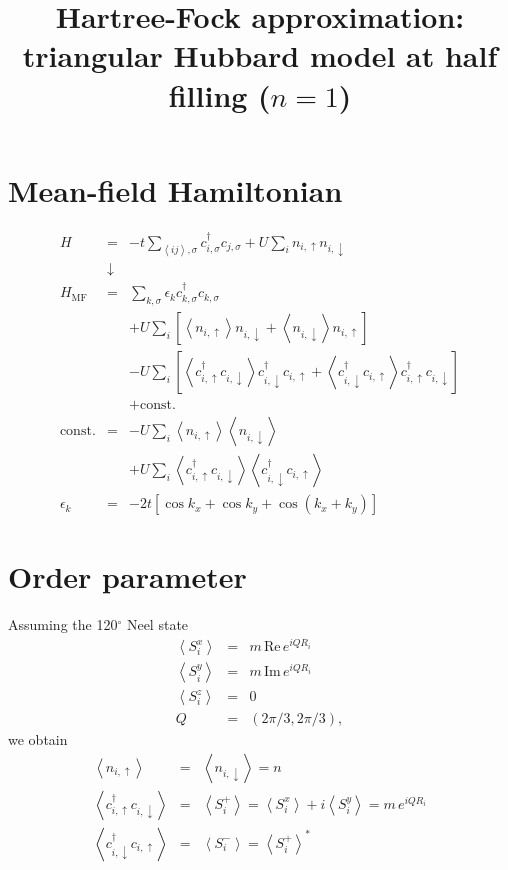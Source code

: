 \documentclass[a4paper,11pt]{article}
\begin{document}
\allowdisplaybreaks


\title{Hartree-Fock approximation:
triangular Hubbard model at half filling ($n=1$)}
\author{}
\date{}
\maketitle

\section{Mean-field Hamiltonian}

\begin{eqnarray}
 H &=&
  - t \sum_{\left<ij\right>,\sigma} c_{i,\sigma}^{\dagger} c_{j,\sigma}
  + U\sum_{i} n_{i,\uparrow} n_{i,\downarrow}
\\
 &\downarrow&
\nonumber
\\
 H_{\mathrm{MF}} &=&
  \sum_{k,\sigma} \epsilon_{k} c_{k,\sigma}^{\dagger} c_{k,\sigma}
\nonumber
\\
 && + U\sum_{i} \left[
   \left<n_{i,\uparrow}\right> n_{i,\downarrow}
   + \left<n_{i,\downarrow}\right> n_{i,\uparrow}
  \right]
\nonumber
\\
 && - U\sum_{i} \left[
   \left<c_{i,\uparrow}^{\dagger}c_{i,\downarrow}\right> c_{i,\downarrow}^{\dagger}c_{i,\uparrow}
   + \left<c_{i,\downarrow}^{\dagger}c_{i,\uparrow}\right> c_{i,\uparrow}^{\dagger}c_{i,\downarrow}
  \right]
\nonumber
\\
 && + \mathrm{const.}
\\
 \mathrm{const.} &=&
  - U\sum_{i} \left<n_{i,\uparrow}\right> \left<n_{i,\downarrow}\right>
\nonumber
\\
 && + U\sum_{i} \left<c_{i,\uparrow}^{\dagger}c_{i,\downarrow}\right> \left<c_{i,\downarrow}^{\dagger}c_{i,\uparrow}\right>
\\
 \epsilon_{k} &=& -2t \left[\cos k_x + \cos k_y + \cos (k_x+k_y)\right]
\end{eqnarray}


\section{Order parameter}

Assuming the 120$^\circ$ Neel state
\begin{eqnarray}
 \left<S_i^x\right> &=& m\, \mathrm{Re}\, e^{iQR_i}
\\
 \left<S_i^y\right> &=& m\, \mathrm{Im}\, e^{iQR_i}
\\
 \left<S_i^z\right> &=& 0
\\
 Q &=& (2\pi/3,2\pi/3),
\end{eqnarray}
we obtain
\begin{eqnarray}
 \left<n_{i,\uparrow}\right> &=& \left<n_{i,\downarrow}\right> = n
\\
 \left<c_{i,\uparrow}^{\dagger}c_{i,\downarrow}\right>
 &=& \left<S_{i}^{+}\right>
  = \left<S_{i}^{x}\right> + i \left<S_{i}^{y}\right>
  = m\, e^{iQR_i}
\\
 \left<c_{i,\downarrow}^{\dagger}c_{i,\uparrow}\right>
 &=& \left<S_{i}^{-}\right>
  =  \left<S_{i}^{+}\right>^{*}
\end{eqnarray}
\end{document}
